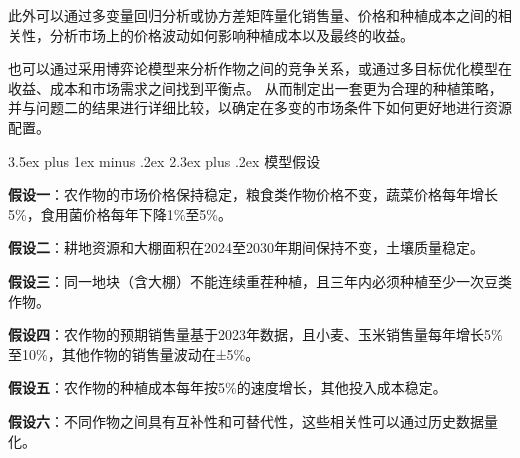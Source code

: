 \documentclass[12pt,a4paper]{nmmcm}
\makeatletter
\renewcommand\section{\@startsection{section}{1}{0pt}%
    {3.5ex plus 1ex minus .2ex}%
    {2.3ex plus .2ex}%
    {\normalfont\LARGE\bfseries}}
\makeatother
\begin{document}
此外可以通过多变量回归分析或协方差矩阵量化销售量、价格和种植成本之间的相关性，分析市场上的价格波动如何影响种植成本以及最终的收益。

也可以通过采用博弈论模型来分析作物之间的竞争关系，或通过多目标优化模型在收益、成本和市场需求之间找到平衡点。
从而制定出一套更为合理的种植策略，并与问题二的结果进行详细比较，以确定在多变的市场条件下如何更好地进行资源配置。



\section{模型假设}

\textbf{假设一}：农作物的市场价格保持稳定，粮食类作物价格不变，蔬菜价格每年增长5\%，食用菌价格每年下降1\%至5\%。


\textbf{假设二}：耕地资源和大棚面积在2024至2030年期间保持不变，土壤质量稳定。


\textbf{假设三}：同一地块（含大棚）不能连续重茬种植，且三年内必须种植至少一次豆类作物。


\textbf{假设四}：农作物的预期销售量基于2023年数据，且小麦、玉米销售量每年增长5\%至10\%，其他作物的销售量波动在±5\%。


\textbf{假设五}：农作物的种植成本每年按5\%的速度增长，其他投入成本稳定。


\textbf{假设六}：不同作物之间具有互补性和可替代性，这些相关性可以通过历史数据量化。
\end{document}

